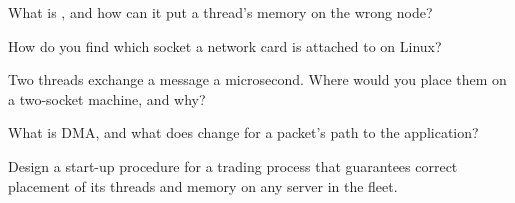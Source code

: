 \begin{interviewq}\label{iq:ll:multi-socket-machines-and-interconnects:2}
What is , and how can it put a thread's memory on the wrong node?
\end{interviewq}

\begin{interviewq}\label{iq:ll:multi-socket-machines-and-interconnects:3}
How do you find which socket a network card is attached to on Linux?
\end{interviewq}

\begin{interviewq}\label{iq:ll:multi-socket-machines-and-interconnects:4}
Two threads exchange a message a microsecond. Where would you place them on a two-socket machine, and why?
\end{interviewq}

\begin{interviewq}\label{iq:ll:multi-socket-machines-and-interconnects:5}
What is DMA, and what does  change for a packet's path to the application?
\end{interviewq}

\begin{interviewq}\label{iq:ll:multi-socket-machines-and-interconnects:6}
Design a start-up procedure for a trading process that guarantees correct placement of its threads and memory on any
server in the fleet.
\end{interviewq}

